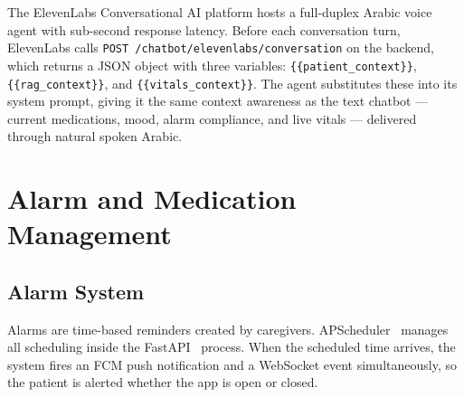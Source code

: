 \documentclass[12pt,a4paper]{report}
\begin{document}
The ElevenLabs Conversational AI platform hosts a full-duplex Arabic voice agent with sub-second response latency. Before each conversation turn, ElevenLabs calls \texttt{POST /chatbot/elevenlabs/conversation} on the backend, which returns a JSON object with three variables: \texttt{\{\{patient\_context\}\}}, \texttt{\{\{rag\_context\}\}}, and \texttt{\{\{vitals\_context\}\}}. The agent substitutes these into its system prompt, giving it the same context awareness as the text chatbot — current medications, mood, alarm compliance, and live vitals — delivered through natural spoken Arabic.

\section{Alarm and Medication Management}

\subsection{Alarm System}

Alarms are time-based reminders created by caregivers. APScheduler~\cite{apscheduler} manages all scheduling inside the FastAPI~\cite{fastapi} process. When the scheduled time arrives, the system fires an FCM push notification and a WebSocket event simultaneously, so the patient is alerted whether the app is open or closed.
\end{document}
